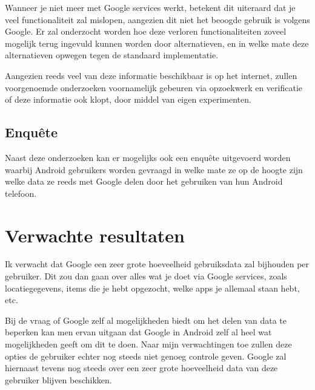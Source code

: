 \vspace{3mm}

\noindent Wanneer je niet meer met Google services werkt, betekent dit uiteraard dat je veel functionaliteit zal mislopen, aangezien dit niet het beoogde gebruik is volgens Google. Er zal onderzocht worden hoe deze verloren functionaliteiten zoveel mogelijk terug ingevuld kunnen worden door alternatieven, en in welke mate deze alternatieven opwegen tegen de standaard implementatie.

\vspace{3mm}

\noindent Aangezien reeds veel van deze informatie beschikbaar is op het internet, zullen voorgenoemde onderzoeken voornamelijk gebeuren via opzoekwerk en verificatie of deze informatie ook klopt, door middel van eigen experimenten.

\subsection{{Enquête}}

\noindent Naast deze onderzoeken kan er mogelijks ook een enquête uitgevoerd worden waarbij Android gebruikers worden gevraagd in welke mate ze op de hoogte zijn welke data ze reeds met Google delen door het gebruiken van hun Android telefoon.

\section{Verwachte resultaten}
\label{sec:verwachte_resultaten}

Ik verwacht dat Google een zeer grote hoeveelheid gebruiksdata zal bijhouden per gebruiker. Dit zou dan gaan over alles wat je doet via Google services, zoals locatiegegevens, items die je hebt opgezocht, welke apps je allemaal staan hebt, etc.

\vspace{3mm}

\noindent Bij de vraag of Google zelf al mogelijkheden biedt om het delen van data te beperken kan men ervan uitgaan dat Google in Android zelf al heel wat mogelijkheden geeft om dit te doen. Naar mijn verwachtingen toe zullen deze opties de gebruiker echter nog steeds niet genoeg controle geven. Google zal hiernaast tevens nog steeds over een zeer grote hoeveelheid data van deze gebruiker blijven beschikken.

